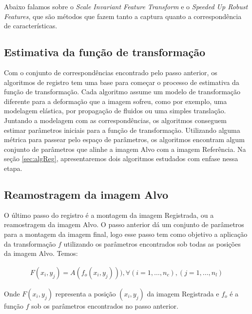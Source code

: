   Abaixo falamos sobre o \textit{Scale Invariant Feature Transform} e o \textit{Speeded Up Robust Features}, que são
métodos que fazem tanto a captura quanto a correspondência de características.

\subsection{Estimativa da função de transformação}

Com o conjunto de correspondências encontrado pelo passo anterior, os algoritmos de registro tem uma base para
começar o processo de estimativa da função de transformação. Cada algoritmo assume um modelo de transformação diferente
para a deformação que a imagem sofreu, como por exemplo, uma modelagem elástica, por propagação de fluidos ou uma
simples translação. Juntando a modelagem com as correspondências, os algoritmos conseguem estimar parâmetros iniciais
para a função de transformação. Utilizando alguma métrica para passear pelo espaço de parâmetros, os algoritmos encontram
algum conjunto de parâmetros que alinhe a imagem Alvo com a imagem Referência. Na seção \ref{sec:algReg}, apresentaremos
dois algoritmos estudados com enfase nessa etapa.

\subsection{Reamostragem da imagem Alvo}

O último passo do registro é a montagem da imagem Registrada, ou a reamostragem da imagem Alvo. O passo anterior
dá um conjunto de parâmetros para a montagem da imagem final, logo esse passo tem como objetivo a aplicação
da transformação $f$ utilizando os parâmetros encontrados sob todas as posições da imagem Alvo. Temos:

\begin{align}\label{eq:reamostragem}
    F(x_i,y_j) = A(f_o(x_i,y_j))), \forall (i = 1, \dots, n_c), (j = 1, \dots, n_l)
\end{align}

    Onde $F(x_i,y_j)$ representa a posição $(x_i,y_j)$ da imagem Registrada e $f_o$ é a função $f$ sob os parâmetros
encontrados no passo anterior.

